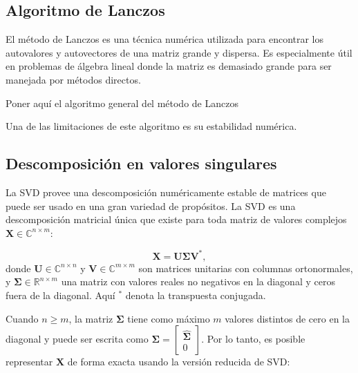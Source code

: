 \subsection*{Algoritmo de Lanczos}

El método de Lanczos es una técnica numérica utilizada para encontrar los autovalores y autovectores de una matriz grande y dispersa. Es especialmente útil en problemas de álgebra lineal donde la matriz es demasiado grande para ser manejada por métodos directos.

\alert{Poner aquí el algoritmo general del método de Lanczos}

Una de las limitaciones de este algoritmo es su estabilidad numérica.

\subsection*{Descomposición en valores singulares}

La SVD provee una descomposición numéricamente estable de matrices que puede ser usado en una gran variedad de propósitos. La SVD es una descomposición matricial única que existe para toda matriz de valores complejos $\mathbf{X} \in \mathbb{C}^{n \times m}$:

\begin{equation}
	\mathbf{X} = \mathbf{U} \mathbf{\Sigma} \mathbf{V}^*,
\end{equation}
donde $\mathbf{U} \in \mathbb{C}^{n \times n}$ y $\mathbf{V} \in \mathbb{C}^{m \times m}$ son matrices unitarias con columnas ortonormales, y $\mathbf{\Sigma} \in \mathbb{R}^{n \times m}$ una matriz con valores reales no negativos en la diagonal y ceros fuera de la diagonal. Aquí $^*$ denota la transpuesta conjugada.

Cuando $n \ge m$, la matriz $\mathbf{\Sigma}$ tiene como máximo $m$ valores distintos de cero en la diagonal y puede ser escrita como $\mathbf{\Sigma} = \begin{bmatrix}\hat{\mathbf{\Sigma}} \\ 0\end{bmatrix}$. Por lo tanto, es posible representar $\mathbf{X}$ de forma exacta usando la versión reducida de SVD:

